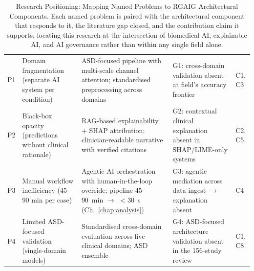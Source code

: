 {\tablestripes\tablefontsize
{}
\begin{xltabular}{\textwidth}{@{} >{\centering\arraybackslash}p{1.0cm} p{3.4cm} p{4.5cm} >{\raggedright\arraybackslash}p{3.8cm} >{\raggedright\arraybackslash}p{2.0cm} @{}}
\caption[Research Positioning: Mapping Named Problems to RGAIG]{Research Positioning: Mapping Named Problems to RGAIG Architectural Components. Each named problem is paired with the architectural component that responds to it, the literature gap closed, and the contribution claim it supports, locating this research at the intersection of biomedical AI, explainable AI, and AI governance rather than within any single field alone.}\label{tab:research_positioning} \\
\toprule
{} &  &  &  &  \\
\midrule
\endfirsthead
\endhead
\bottomrule
\endlastfoot
P1 & Domain fragmentation (separate AI system per condition) & ASD-focused pipeline with multi-scale channel attention; standardised preprocessing across domains & G1: cross-domain validation absent at field's accuracy frontier & C1, C3 \\
\addlinespace
P2 & Black-box opacity (predictions without clinical rationale) & RAG-based explainability $+$ SHAP attribution; clinician-readable narrative with verified citations & G2: contextual clinical explanation absent in SHAP/LIME-only systems & C2, C5 \\
\addlinespace
P3 & Manual workflow inefficiency (45--90 min per case) & Agentic AI orchestration with human-in-the-loop override; pipeline 45--90~min $\to$ $<$30~s (Ch.~\ref{chap:analysis}) & G3: agentic mediation across data ingest $\to$ explanation absent & C4 \\
\addlinespace
P4 & Limited ASD-focused validation (single-domain models) & Standardised cross-domain evaluation across five clinical domains; ASD ensemble \asdacc{} & G4: ASD-focused architecture validation absent in the 156-study review & C1, C8 \\
\end{xltabular}}

